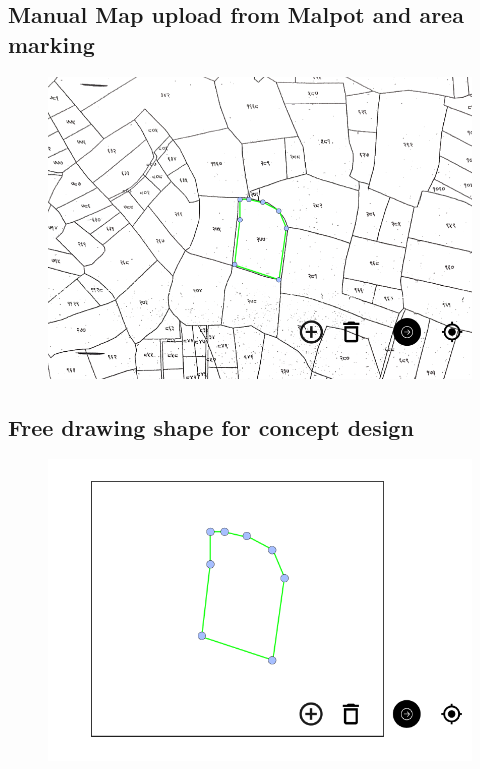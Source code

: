 	\subsection{Manual Map upload from Malpot and area marking} \label{Appendix: Manual Map upload from Malpot and area marking}
		\begin{figure}[H]
			\centering
				\includegraphics[width=1\textwidth]{img/chapter_7/api1.png}
		\end{figure}

	\subsection{Free drawing shape for concept design} \label{Appendix: Free drawing shape for concept design}
		\begin{figure}[H]
			\centering
				\includegraphics[width=1\textwidth]{img/chapter_7/free.png}
		\end{figure}
